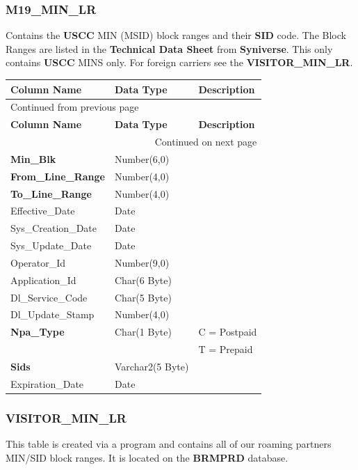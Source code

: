 \documentclass[12pt,twoside]{article}
\begin{document}
\subsubsection{M19\_MIN\_LR}
\label{sec:orgheadline44}
Contains the \textbf{USCC} MIN (MSID) block ranges and their \textbf{SID}
code. The Block Ranges are listed in the \textbf{Technical Data Sheet}
from \textbf{Syniverse}. This only contains \textbf{USCC} MINS only. For
foreign carriers see the \textbf{VISITOR\_MIN\_LR}.
\footnotesize

\begin{longtable}{l|l|l}
\hline
\textbf{Column Name} & \textbf{Data Type} & \textbf{Description}\\
\hline
\endfirsthead
\multicolumn{3}{l}{Continued from previous page} \\
\hline

\textbf{Column Name} & \textbf{Data Type} & \textbf{Description} \\

\hline
\endhead
\hline\multicolumn{3}{r}{Continued on next page} \\
\endfoot
\endlastfoot
\hline
\textbf{Min\_Blk} & Number(6,0) & \\
\textbf{From\_Line\_Range} & Number(4,0) & \\
\textbf{To\_Line\_Range} & Number(4,0) & \\
Effective\_Date & Date & \\
Sys\_Creation\_Date & Date & \\
Sys\_Update\_Date & Date & \\
Operator\_Id & Number(9,0) & \\
Application\_Id & Char(6 Byte) & \\
Dl\_Service\_Code & Char(5 Byte) & \\
Dl\_Update\_Stamp & Number(4,0) & \\
\textbf{Npa\_Type} & Char(1 Byte) & C = Postpaid\\
 &  & T = Prepaid\\
\textbf{Sids} & Varchar2(5 Byte) & \\
Expiration\_Date & Date & \\
\hline
\end{longtable}

\normalsize

\subsubsection{VISITOR\_MIN\_LR}
\label{sec:orgheadline45}
This table is created via a program and contains all of our
roaming partners MIN/SID block ranges. It is located on the
\textbf{BRMPRD} database.
\end{document}
